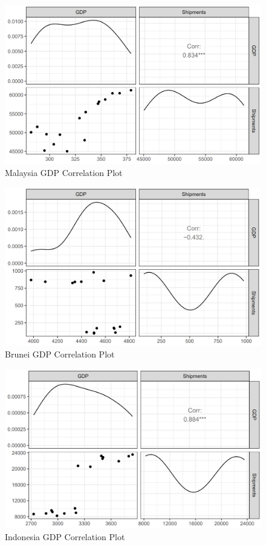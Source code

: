 \documentclass{article}
\begin{document}
\begin{figure}[H]
    \centering
    \includegraphics[width=1\textwidth]{images/Line Plots/Malaysia/Malaysia_Corrplot.png}
    \caption{Malaysia GDP Correlation Plot}
    \label{fig:my_label}
\end{figure}

\begin{figure}[H]
    \centering
    \includegraphics[width=1\textwidth]{images/Line Plots/Brunei/Brunei_Corrplot.png}
    \caption{Brunei GDP Correlation Plot}
    \label{fig:my_label}
\end{figure}

\begin{figure}[H]
    \centering
    \includegraphics[width=1\textwidth]{images/Line Plots/Indonesia/Indonesia_Corrplot.png}
    \caption{Indonesia GDP Correlation Plot}
    \label{fig:my_label}
\end{figure}
\end{document}
